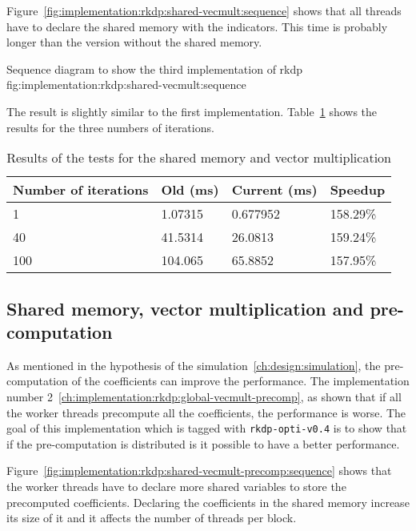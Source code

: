 Figure~\ref{fig:implementation:rkdp:shared-vecmult:sequence} shows that all
threads have to declare the shared memory with the indicators.
This time is probably longer than the version without the shared memory.

{Sequence diagram to show the third implementation of \acrshort{rkdp}}
{fig:implementation:rkdp:shared-vecmult:sequence}

The result is slightly similar to the first implementation.
Table~\ref{tab:implementation:rkdp:shared-vecmult:results} shows the results
for the three numbers of iterations.

\begin{table}[ht]
    \centering
    \begin{tabular}{|l|l|l|l|}
        \hline
        \textbf{Number of iterations} & \textbf{Old (ms)} & \textbf{Current (ms)} & \textbf{Speedup} \\
        \hline
        1 & 1.07315 & 0.677952 & 158.29\% \\
        \hline
        40 & 41.5314 & 26.0813 & 159.24\% \\
        \hline
        100 & 104.065 & 65.8852 & 157.95\% \\
        \hline
    \end{tabular}
    \caption{Results of the tests for the shared memory and vector multiplication}
    \label{tab:implementation:rkdp:shared-vecmult:results}
\end{table}

\subsection{Shared memory, vector multiplication and pre-computation}
\label{ch:implementation:rkdp:shared-vecmult-precomp}

As mentioned in the hypothesis of the simulation~\ref{ch:design:simulation}, the
pre-computation of the coefficients can improve the performance.
The implementation number 2~\ref{ch:implementation:rkdp:global-vecmult-precomp},
as shown that if all the worker threads precompute all the coefficients, the
performance is worse.
The goal of this implementation which is tagged with \texttt{rkdp-opti-v0.4} is
to show that if the pre-computation is distributed is it possible to have a
better performance.

Figure~\ref{fig:implementation:rkdp:shared-vecmult-precomp:sequence} shows that
the worker threads have to declare more shared variables to store the
precomputed coefficients.
Declaring the coefficients in the shared memory increase its size of it and it
affects the number of threads per block.

